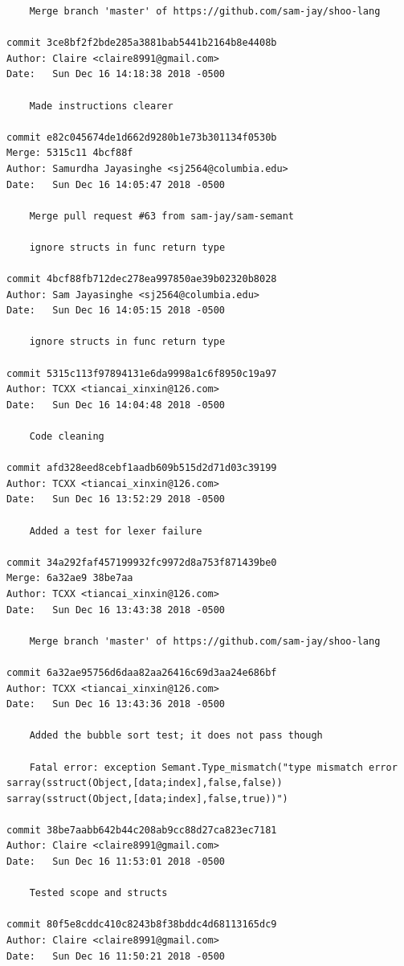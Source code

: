 \documentclass[12pt]{article}
\begin{document}
\begin{lstlisting}
    Merge branch 'master' of https://github.com/sam-jay/shoo-lang

commit 3ce8bf2f2bde285a3881bab5441b2164b8e4408b
Author: Claire <claire8991@gmail.com>
Date:   Sun Dec 16 14:18:38 2018 -0500

    Made instructions clearer

commit e82c045674de1d662d9280b1e73b301134f0530b
Merge: 5315c11 4bcf88f
Author: Samurdha Jayasinghe <sj2564@columbia.edu>
Date:   Sun Dec 16 14:05:47 2018 -0500

    Merge pull request #63 from sam-jay/sam-semant
    
    ignore structs in func return type

commit 4bcf88fb712dec278ea997850ae39b02320b8028
Author: Sam Jayasinghe <sj2564@columbia.edu>
Date:   Sun Dec 16 14:05:15 2018 -0500

    ignore structs in func return type

commit 5315c113f97894131e6da9998a1c6f8950c19a97
Author: TCXX <tiancai_xinxin@126.com>
Date:   Sun Dec 16 14:04:48 2018 -0500

    Code cleaning

commit afd328eed8cebf1aadb609b515d2d71d03c39199
Author: TCXX <tiancai_xinxin@126.com>
Date:   Sun Dec 16 13:52:29 2018 -0500

    Added a test for lexer failure

commit 34a292faf457199932fc9972d8a753f871439be0
Merge: 6a32ae9 38be7aa
Author: TCXX <tiancai_xinxin@126.com>
Date:   Sun Dec 16 13:43:38 2018 -0500

    Merge branch 'master' of https://github.com/sam-jay/shoo-lang

commit 6a32ae95756d6daa82aa26416c69d3aa24e686bf
Author: TCXX <tiancai_xinxin@126.com>
Date:   Sun Dec 16 13:43:36 2018 -0500

    Added the bubble sort test; it does not pass though
    
    Fatal error: exception Semant.Type_mismatch("type mismatch error sarray(sstruct(Object,[data;index],false,false)) sarray(sstruct(Object,[data;index],false,true))")

commit 38be7aabb642b44c208ab9cc88d27ca823ec7181
Author: Claire <claire8991@gmail.com>
Date:   Sun Dec 16 11:53:01 2018 -0500

    Tested scope and structs

commit 80f5e8cddc410c8243b8f38bddc4d68113165dc9
Author: Claire <claire8991@gmail.com>
Date:   Sun Dec 16 11:50:21 2018 -0500


\end{lstlisting}
\end{document}
